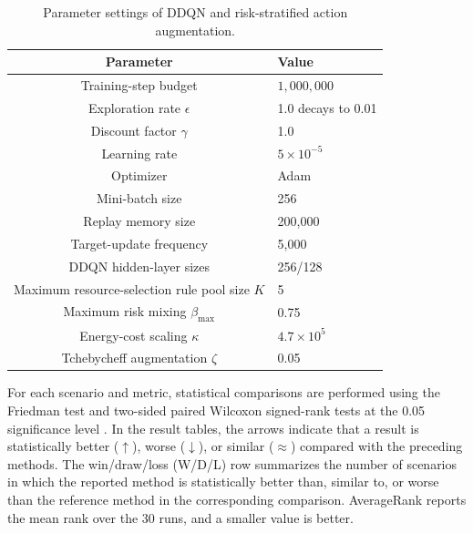 \documentclass[10pt,journal]{IEEEtran}
\begin{document}
\begin{table}[!t]
\caption{Parameter settings of DDQN and risk-stratified action
augmentation.}
\label{Table: DDQN risk parameters}
\centering
\begin{tabular}{cl}
\toprule
\textbf{Parameter} & \textbf{Value} \\
\midrule
Training-step budget & $1{,}000{,}000$ \\
Exploration rate $\epsilon$ & 1.0 decays to 0.01 \\
Discount factor $\gamma$ & 1.0 \\
Learning rate & $5\times10^{-5}$ \\
Optimizer & Adam \\
Mini-batch size & 256 \\
Replay memory size & 200,000 \\
Target-update frequency & 5,000 \\
DDQN hidden-layer sizes & 256/128 \\
Maximum resource-selection rule pool size $K$ & 5 \\
Maximum risk mixing $\beta_{\max}$ & 0.75 \\
Energy-cost scaling $\kappa$ & $4.7\times10^5$ \\
Tchebycheff augmentation $\zeta$ & 0.05 \\
\bottomrule
\end{tabular}
\end{table}

For each scenario and metric, statistical comparisons are performed using the Friedman test and two-sided paired Wilcoxon signed-rank tests at the 0.05 significance level \cite{ccgp}. In the result tables, the arrows indicate that a result is statistically better ($\uparrow$), worse ($\downarrow$), or similar ($\approx$) compared with the preceding methods. The win/draw/loss (W/D/L) row summarizes the number of scenarios in which the reported method is statistically better than, similar to, or worse than the reference method in the corresponding comparison. AverageRank reports the mean rank over the 30 runs, and a smaller value is better.
\end{document}
